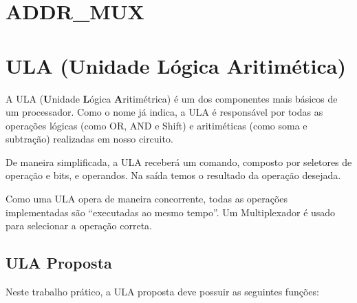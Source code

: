 \documentclass{article}
\begin{document}
\section{ADDR\_MUX}
\lipsum[1]

\section{ULA (Unidade Lógica Aritimética)}

A ULA (\textbf{U}nidade \textbf{L}ógica \textbf{A}ritimétrica) é um dos componentes mais básicos de um processador. Como o nome já indica, a ULA é responsável por todas as operações lógicas (como OR, AND e Shift) e aritiméticas (como soma e subtração) realizadas em nosso circuito.

De maneira simplificada, a ULA receberá um comando, composto por seletores de operação e bits, e operandos. Na saída temos o resultado da operação desejada.

Como uma ULA opera de maneira concorrente, todas as operações implementadas são ``executadas ao mesmo tempo''. Um Multiplexador é usado para selecionar a operação correta.

\subsection{ULA Proposta}

Neste trabalho prático, a ULA proposta deve possuir as seguintes funções:
\end{document}

